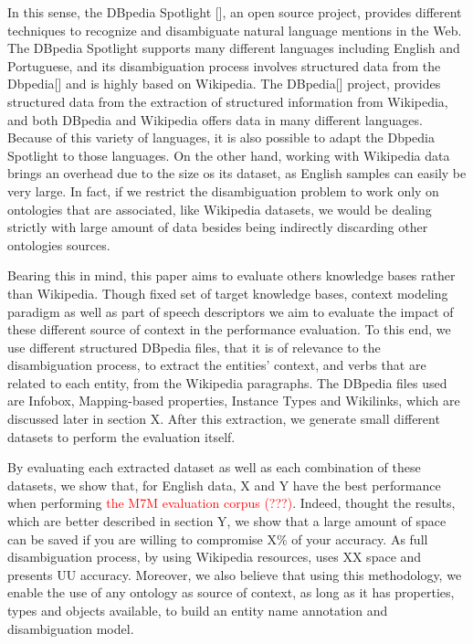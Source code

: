 \documentclass[10pt,a4paper]{article}
\begin{document}
In this sense, the DBpedia Spotlight [],  an open source project, provides different techniques to recognize  and disambiguate natural language mentions in the Web. The DBpedia Spotlight  supports many different languages including English and Portuguese, and its disambiguation process  involves  structured data from the Dbpedia[] and is highly based on Wikipedia. The DBpedia[] project, provides structured data from the extraction of structured information from Wikipedia, and  both DBpedia  and Wikipedia offers data in many different languages. Because of this variety of languages,  it is also possible to adapt the Dbpedia Spotlight to those languages. On the other hand, working with Wikipedia data brings an overhead due to the size os its dataset, as English samples can easily be very large. In fact, if we restrict the disambiguation problem to work only on ontologies that are associated, like Wikipedia datasets, we would be  dealing strictly with large amount of data besides being  indirectly discarding other ontologies sources.


Bearing this in mind, this paper aims to evaluate  others knowledge bases rather than Wikipedia.  Though fixed set of target knowledge bases, context modeling paradigm as well as part of speech descriptors we aim to evaluate the impact of these different source of context in the performance evaluation. To this end, we use different structured DBpedia files, that it is of relevance to the disambiguation process, to extract the entities' context, and verbs that are related to each entity, from the Wikipedia paragraphs. The DBpedia files used  are Infobox, Mapping-based properties, Instance Types and Wikilinks, which are discussed later in section X. After this extraction,  we generate small different datasets to perform the evaluation itself.

By evaluating each extracted dataset as well as each combination of these datasets, we  show that, for English data, X and Y have the best performance when performing  \textcolor{red}{the M7M evaluation corpus (???)}. Indeed,  thought the results, which are better described in section Y, we show  that a large amount of space can be saved if you are willing to compromise X\% of your accuracy. As full disambiguation process, by using Wikipedia resources, uses XX space and presents UU accuracy. Moreover, we also believe that using this methodology, we enable the use of any ontology as source of context, as long as it has properties, types and objects available, to build an entity name annotation and disambiguation model.
\end{document}
